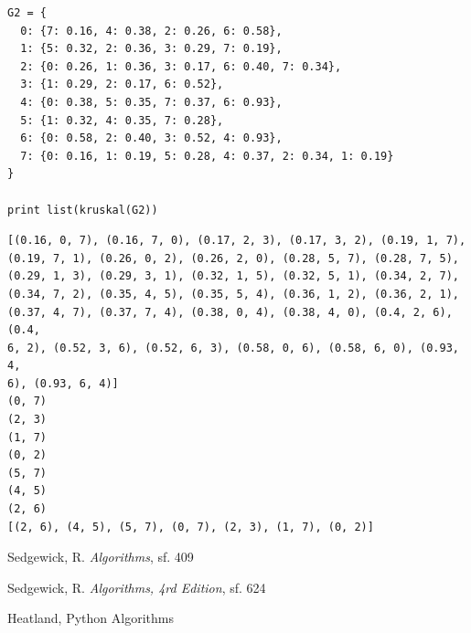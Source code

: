 \documentclass[12pt,fleqn]{article}\usepackage{../common}
\begin{document}
\begin{verbatim}
G2 = {
  0: {7: 0.16, 4: 0.38, 2: 0.26, 6: 0.58},
  1: {5: 0.32, 2: 0.36, 3: 0.29, 7: 0.19},
  2: {0: 0.26, 1: 0.36, 3: 0.17, 6: 0.40, 7: 0.34},
  3: {1: 0.29, 2: 0.17, 6: 0.52},
  4: {0: 0.38, 5: 0.35, 7: 0.37, 6: 0.93},
  5: {1: 0.32, 4: 0.35, 7: 0.28},
  6: {0: 0.58, 2: 0.40, 3: 0.52, 4: 0.93},
  7: {0: 0.16, 1: 0.19, 5: 0.28, 4: 0.37, 2: 0.34, 1: 0.19}
} 

print list(kruskal(G2))
\end{verbatim}

\begin{verbatim}
[(0.16, 0, 7), (0.16, 7, 0), (0.17, 2, 3), (0.17, 3, 2), (0.19, 1, 7),
(0.19, 7, 1), (0.26, 0, 2), (0.26, 2, 0), (0.28, 5, 7), (0.28, 7, 5),
(0.29, 1, 3), (0.29, 3, 1), (0.32, 1, 5), (0.32, 5, 1), (0.34, 2, 7),
(0.34, 7, 2), (0.35, 4, 5), (0.35, 5, 4), (0.36, 1, 2), (0.36, 2, 1),
(0.37, 4, 7), (0.37, 7, 4), (0.38, 0, 4), (0.38, 4, 0), (0.4, 2, 6), (0.4,
6, 2), (0.52, 3, 6), (0.52, 6, 3), (0.58, 0, 6), (0.58, 6, 0), (0.93, 4,
6), (0.93, 6, 4)] 
(0, 7)
(2, 3)
(1, 7)
(0, 2)
(5, 7)
(4, 5)
(2, 6)
[(2, 6), (4, 5), (5, 7), (0, 7), (2, 3), (1, 7), (0, 2)]
\end{verbatim}


















Sedgewick, R. {\em Algorithms}, sf. 409

Sedgewick, R. {\em Algorithms, 4rd Edition}, sf. 624

Heatland, Python Algorithms
\end{document}
